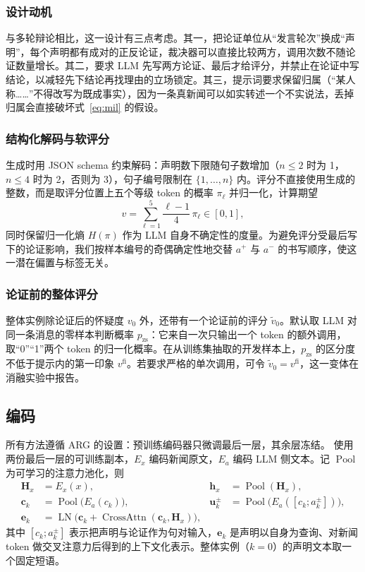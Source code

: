 \subsubsection{设计动机}
与多轮辩论\citep{liu2025ted,han2025d2d}相比，这一设计有三点考虑。其一，把论证单位从“发言轮次”换成“声明”，每个声明都有成对的正反论证，裁决器可以直接比较两方，调用次数不随论证数量增长。其二，要求 LLM 先写两方论证、最后才给评分，并禁止在论证中写结论，以减轻先下结论再找理由的立场锁定。其三，提示词要求保留归属（“某人称……”不得改写为既成事实），因为一条真新闻可以如实转述一个不实说法，丢掉归属会直接破坏式~\eqref{eq:mil} 的假设。

\subsubsection{结构化解码与软评分}
生成时用 JSON schema 约束解码\citep{kwon2023vllm,dong2024xgrammar}：声明数下限随句子数增加（$n\le2$ 时为 1，$n\le4$ 时为 2，否则为 3），句子编号限制在 $\{1,\dots,n\}$ 内。评分不直接使用生成的整数，而是取评分位置上五个等级 token 的概率 $\pi_\ell$ 并归一化，计算期望
\begin{equation}
v=\sum_{\ell=1}^{5}\frac{\ell-1}{4}\,\pi_\ell\in[0,1],
\end{equation}
同时保留归一化熵 $H(\pi)$ 作为 LLM 自身不确定性的度量。为避免评分受最后写下的论证影响，我们按样本编号的奇偶确定性地交替 $a^+$ 与 $a^-$ 的书写顺序，使这一潜在偏置与标签无关。

\subsubsection{论证前的整体评分}
整体实例除论证后的怀疑度 $v_0$ 外，还带有一个论证前的评分 $\tilde v_0$。默认取 LLM 对同一条消息的零样本判断概率 $p_{\mathrm{zs}}$：它来自一次只输出一个 token 的额外调用，取“0”“1”两个 token 的归一化概率。在从训练集抽取的开发样本上，$p_{\mathrm{zs}}$ 的区分度不低于提示内的第一印象 $v^{\mathrm{fi}}$。若要求严格的单次调用，可令 $\tilde v_0=v^{\mathrm{fi}}$，这一变体在消融实验中报告。

\subsection{编码}\label{sec:enc}

所有方法遵循 ARG\citep{hu2024bad} 的设置：预训练编码器只微调最后一层，其余层冻结。\method{} 使用两份最后一层的可训练副本，$E_x$ 编码新闻原文，$E_a$ 编码 LLM 侧文本。记 $\operatorname{Pool}$ 为可学习的注意力池化，则
\begin{align}
\bm H_x &= E_x(x), & \bm h_x &= \operatorname{Pool}(\bm H_x),\\
\bm c_k &= \operatorname{Pool}\!\big(E_a(c_k)\big), & \bm u_k^{\pm} &= \operatorname{Pool}\!\big(E_a([c_k;a_k^{\pm}])\big),\\
\bm e_k &= \operatorname{LN}\!\big(\bm c_k+\operatorname{CrossAttn}(\bm c_k,\bm H_x)\big),
\end{align}
其中 $[c_k;a_k^{\pm}]$ 表示把声明与论证作为句对输入，$\bm e_k$ 是声明以自身为查询、对新闻 token 做交叉注意力后得到的上下文化表示。整体实例（$k{=}0$）的声明文本取一个固定短语。

